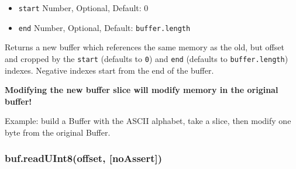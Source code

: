 \begin{itemize}
\itemsep1pt\parskip0pt
\item
  \texttt{start} Number, Optional, Default: 0
\item
  \texttt{end} Number, Optional, Default: \texttt{buffer.length}
\end{itemize}

Returns a new buffer which references the same memory as the old, but
offset and cropped by the \texttt{start} (defaults to \texttt{0}) and
\texttt{end} (defaults to \texttt{buffer.length}) indexes. Negative
indexes start from the end of the buffer.

\textbf{Modifying the new buffer slice will modify memory in the
original buffer!}

Example: build a Buffer with the ASCII alphabet, take a slice, then
modify one byte from the original Buffer.

\begin{Shaded}
\begin{Highlighting}[]
  \NormalTok{(}\NormalTok{);}

 \NormalTok{(}   
  \NormalTok{; }
\NormalTok{\}}

 \NormalTok{(}\NormalTok{, }\NormalTok{);}
\NormalTok{(}\NormalTok{(}\NormalTok{, }\NormalTok{, }\NormalTok{));}
\NormalTok{buf1[}\NormalTok{] = }\NormalTok{;}
\NormalTok{(}\NormalTok{(}\NormalTok{, }\NormalTok{, }\NormalTok{));}

\end{Highlighting}
\end{Shaded}

\subsubsection{buf.readUInt8(offset,
{[}noAssert{]})}\label{buf.readuint8offset-noassert}

